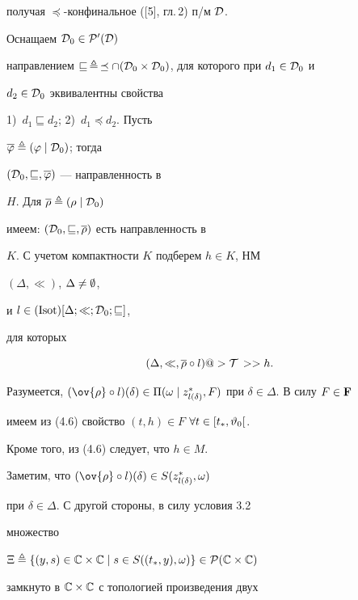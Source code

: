 \begin{pf}
получая $\preceq$-конфинальное ([5], гл.\,2) п/м ${\cal D}$.


Оснащаем ${{\cal D}_0} \in {{\cal P}'}({\cal D})$


направлением $\sqsubseteq\, \stac\, \preceq \cap ({{\cal D}_0} \times


{{\cal D}_0})$, для которого при ${d_1} \in {{\cal D}_0}$ и


${d_2} \in {{\cal D}_0}$ эквивалентны свойства


1)~${d_1} \sqsubseteq {d_2}$; 2)~${d_1} \preceq {d_2}$. Пусть


$\overline{\varphi} \triangleq (\varphi \mid {{\cal D}_0})$; тогда


$({{\cal D}_0},\sqsubseteq,\overline{\varphi})$ --- направленность в


$H$. Для $\overline{\rho} \triangleq (\rho \mid {{\cal D}_0})$


имеем: $({{\cal D}_0},\sqsubseteq,\overline{\rho})$ есть направленность в


$K$. С учетом компактности $K$ подберем $h \in K$, НМ


$(\Delta,\ll)$, $\Delta \ne \emptyset$,


и $l \in (\operatorname{Isot})[\Delta;\ll;{{\cal D}_0};\sqsubseteq]$,


для которых


\begin{equation}


(\Delta,\ll,{\overline{\rho}} \circ l) @>{\cal T\,}>> h.


\end{equation}


Разумеется, $(\ov{\rho} \circ l)(\delta) \in {\Pi}(\omega \mid


{z_{l(\delta)}^*},F)$ при $\delta \in \Delta$. В силу $F \in {\bold F}$


имеем из (4.6) свойство $(t,h) \in F$ $\forall{t} \in [{t_*},{{\vartheta}_0}[$.


Кроме того, из (4.6) следует, что $h \in M$.


Заметим, что $(\ov{\rho} \circ l)(\delta) \in S({z_{l(\delta)}^*},\omega)$


при $\delta \in \Delta$. С другой стороны, в силу условия 3.2


множество


$\Xi \stac \{(y,s) \in {\Bbb C} \times {\Bbb C} \mid s \in S(({t_*},y),


\omega)\} \in {\cal P}({\Bbb C} \times {\Bbb C})$


замкнуто в ${\Bbb C} \times {\Bbb C}$ с топологией произведения двух



\end{pf}
